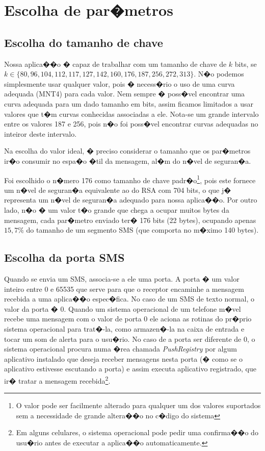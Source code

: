 \documentclass[a4paper,capchap,espacoduplo,normaltoc]{abntepusp}
\begin{document}
\section{Escolha de par�metros}

\subsection{Escolha do tamanho de chave}\label{sec:escolhatamanhochave}

Nossa aplica��o � capaz de trabalhar com um tamanho de chave de $k$ bits, se $k \in \{80, 96, 104, 112, 117, 127, 142, 160, 176, 187, 256, 272, 313\}$. N�o podemos simplesmente usar qualquer valor, pois � necess�rio o uso de uma curva adequada (MNT4) para cada valor. Nem sempre � poss�vel encontrar uma curva adequada para um dado tamanho em bits, assim ficamos limitados a usar valores que t�m curvas conhecidas associadas a ele. Nota-se um grande intervalo entre os valores 187 e 256, pois n�o foi poss�vel encontrar curvas adequadas no inteiror deste intervalo.

Na escolha do valor ideal, � preciso considerar o tamanho que os par�metros ir�o consumir no espa�o �til da mensagem, al�m do n�vel de seguran�a.

Foi escolhido o n�mero 176 como tamanho de chave padr�o\footnote{O valor pode ser facilmente alterado para qualquer um dos valores suportados sem a necessidade de grande altera��o no c�digo do sistema}, pois este fornece um n�vel de seguran�a equivalente ao do RSA com 704 bits, o que j� representa um n�vel de seguran�a adequado para nossa aplica��o. Por outro lado, n�o � um valor t�o grande que chega a ocupar muitos bytes da mensagem, cada par�metro enviado ter� 176 bits (22 bytes), ocupando apenas $15,7\%$ do tamanho de um segmento SMS (que comporta no m�ximo 140 bytes).%
\subsection{Escolha da porta SMS}
Quando se envia um SMS, associa-se a ele uma porta. A porta � um valor inteiro entre 0 e 65535 que serve para que o receptor encaminhe a mensagem recebida a uma aplica��o espec�fica. No caso de um SMS de texto normal, o valor da porta � 0. Quando um sistema operacional de um telefone m�vel recebe uma mensagem com o valor de porta 0 ele aciona as rotinas do pr�prio sistema operacional para trat�-la, como armazen�-la na caixa de entrada e tocar um som de alerta para o usu�rio. No caso de a porta ser diferente de 0, o sistema operacional procura numa �rea chamada \emph{PushRegistry} por algum aplicativo instalado que deseja receber mensagens nesta porta (� como se o aplicativo estivesse escutando a porta) e assim executa aplicativo registrado, que ir� tratar a mensagem recebida\footnote{Em alguns celulares, o sistema operacional pode pedir uma confirma��o do usu�rio antes de executar a aplica��o automaticamente.}.
\end{document}
